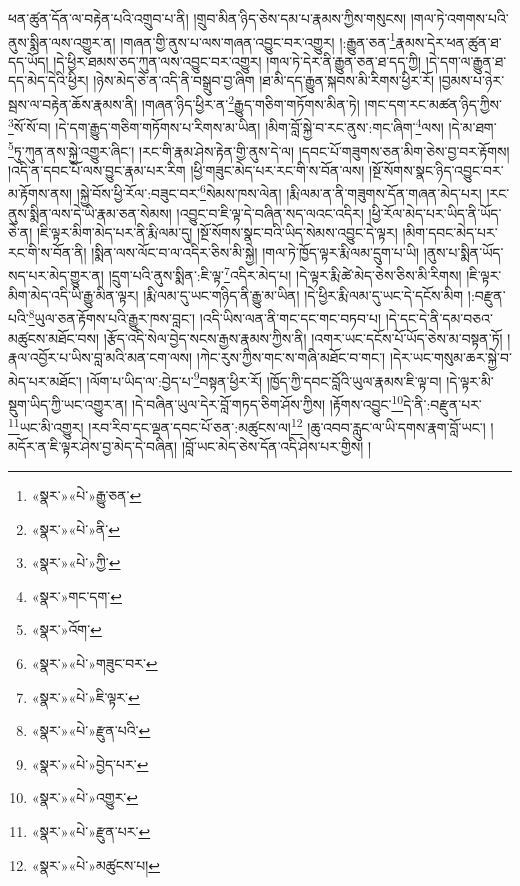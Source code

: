 ཕན་ཚུན་དོན་ལ་བརྟེན་པའི་འགྲུབ་པ་ནི། །གྲུབ་མིན་ཉིད་ཅེས་དམ་པ་རྣམས་ཀྱིས་གསུངས། །གལ་ཏེ་འགགས་པའི་ནུས་སྨིན་ལས་འགྱུར་ན། །གཞན་གྱི་ནུས་པ་ལས་གཞན་འབྱུང་བར་འགྱུར། །:རྒྱུན་ཅན་\footnote{«སྣར་»«པེ་»རྒྱུ་ཅན་}རྣམས་དེར་ཕན་ཚུན་ཐ་དད་ཡོད། །དེ་ཕྱིར་ཐམས་ཅད་ཀུན་ལས་འབྱུང་བར་འགྱུར། །གལ་ཏེ་དེར་ནི་རྒྱུན་ཅན་ཐ་དད་ཀྱི། །དེ་དག་ལ་རྒྱུན་ཐ་དད་མེད་དེའི་ཕྱིར། །ཉེས་མེད་ཅེ་ན་འདི་ནི་བསྒྲུབ་བྱ་ཞིག །ཐ་མི་དད་རྒྱུན་སྐབས་མི་རིགས་ཕྱིར་རོ། །བྱམས་པ་ཉེར་སྦས་ལ་བརྟེན་ཆོས་རྣམས་ནི། །གཞན་ཉིད་ཕྱིར་ན་\footnote{«སྣར་»«པེ་»ནི་}རྒྱུད་གཅིག་གཏོགས་མིན་ཏེ། །གང་དག་རང་མཚན་ཉིད་ཀྱིས་\footnote{«སྣར་»«པེ་»ཀྱི་}སོ་སོ་བ། །དེ་དག་རྒྱུད་གཅིག་གཏོགས་པ་རིགས་མ་ཡིན། །མིག་བློ་སྐྱེ་བ་རང་ནུས་:གང་ཞིག་\footnote{«སྣར་»གང་དག་}ལས། །དེ་མ་ཐག་\footnote{«སྣར་»འོག་}ཏུ་ཀུན་ནས་སྐྱེ་འགྱུར་ཞིང་། །རང་གི་རྣམ་ཤེས་རྟེན་གྱི་ནུས་དེ་ལ། །དབང་པོ་གཟུགས་ཅན་མིག་ཅེས་བྱ་བར་རྟོགས། །འདི་ན་དབང་པོ་ལས་བྱུང་རྣམ་པར་རིག །ཕྱི་གཟུང་མེད་པར་རང་གི་ས་བོན་ལས། །སྔོ་སོགས་སྣང་ཉིད་འབྱུང་བར་མ་རྟོགས་ནས། །སྐྱེ་བོས་ཕྱི་རོལ་:བཟུང་བར་\footnote{«སྣར་»«པེ་»གཟུང་བར་}སེམས་ཁས་ལེན། །རྨི་ལམ་ན་ནི་གཟུགས་དོན་གཞན་མེད་པར། །རང་ནུས་སྨིན་ལས་དེ་ཡི་རྣམ་ཅན་སེམས། །འབྱུང་བ་ཇི་ལྟ་དེ་བཞིན་སད་ལའང་འདིར། །ཕྱི་རོལ་མེད་པར་ཡིད་ནི་ཡོད་ཅེ་ན། །ཇི་ལྟར་མིག་མེད་པར་ནི་རྨི་ལམ་དུ། །སྔོ་སོགས་སྣང་བའི་ཡིད་སེམས་འབྱུང་དེ་ལྟར། །མིག་དབང་མེད་པར་རང་གི་ས་བོན་ནི། །སྨིན་ལས་ལོང་བ་ལ་འདིར་ཅིས་མི་སྐྱེ། །གལ་ཏེ་ཁྱོད་ལྟར་རྨི་ལམ་དྲུག་པ་ཡི། །ནུས་པ་སྨིན་ཡོད་སད་པར་མེད་གྱུར་ན། །དྲུག་པའི་ནུས་སྨིན་:ཇི་ལྟ་\footnote{«སྣར་»«པེ་»ཇི་ལྟར་}འདིར་མེད་པ། །དེ་ལྟར་རྨི་ཚེ་མེད་ཅེས་ཅིས་མི་རིགས། །ཇི་ལྟར་མིག་མེད་འདི་ཡི་རྒྱུ་མིན་ལྟར། །རྨི་ལམ་དུ་ཡང་གཉིད་ནི་རྒྱུ་མ་ཡིན། །དེ་ཕྱིར་རྨི་ལམ་དུ་ཡང་དེ་དངོས་མིག །:བརྫུན་པའི་\footnote{«སྣར་»«པེ་»རྫུན་པའི་}ཡུལ་ཅན་རྟོགས་པའི་རྒྱུར་ཁས་བླང་། །འདི་ཡིས་ལན་ནི་གང་དང་གང་བཏབ་པ། །དེ་དང་དེ་ནི་དམ་བཅའ་མཚུངས་མཐོང་བས། །རྩོད་འདི་སེལ་བྱེད་སངས་རྒྱས་རྣམས་ཀྱིས་ནི། །འགར་ཡང་དངོས་པོ་ཡོད་ཅེས་མ་བསྟན་ཏོ། །རྣལ་འབྱོར་པ་ཡིས་བླ་མའི་མན་ངག་ལས། །ཀེང་རུས་ཀྱིས་གང་ས་གཞི་མཐོང་བ་གང་། །དེར་ཡང་གསུམ་ཆར་སྐྱེ་བ་མེད་པར་མཐོང་། །ལོག་པ་ཡིད་ལ་:བྱེད་པ་\footnote{«སྣར་»«པེ་»བྱེད་པར་}བསྟན་ཕྱིར་རོ། །ཁྱོད་ཀྱི་དབང་བློའི་ཡུལ་རྣམས་ཇི་ལྟ་བ། །དེ་ལྟར་མི་སྡུག་ཡིད་ཀྱི་ཡང་འགྱུར་ན། །དེ་བཞིན་ཡུལ་དེར་བློ་གཏད་ཅིག་ཤོས་ཀྱིས། །རྟོགས་འབྱུང་\footnote{«སྣར་»«པེ་»འགྱུར་}དེ་ནི་:བརྫུན་པར་\footnote{«སྣར་»«པེ་»རྫུན་པར་}ཡང་མི་འགྱུར། །རབ་རིབ་དང་ལྡན་དབང་པོ་ཅན་:མཚུངས་ལ།\footnote{«སྣར་»«པེ་»མཚུངས་པ།} །ཆུ་འབབ་རླུང་ལ་ཡི་དགས་རྣག་བློ་ཡང་། །མདོར་ན་ཇི་ལྟར་ཤེས་བྱ་མེད་དེ་བཞིན། །བློ་ཡང་མེད་ཅེས་དོན་འདི་ཤེས་པར་གྱིས། །
